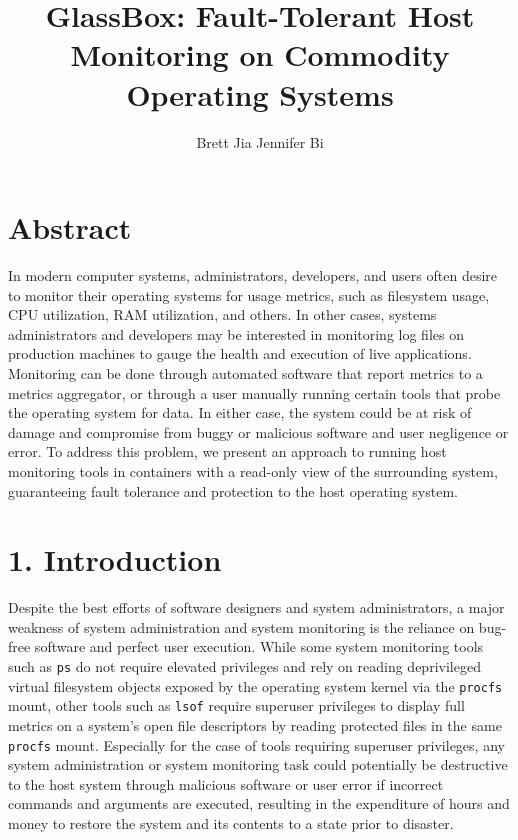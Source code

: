 \documentclass{proc}
\begin{document}
\title{GlassBox: Fault-Tolerant Host Monitoring on Commodity Operating Systems}

\author{Brett Jia \hspace{1em} Jennifer Bi}

\maketitle

\section*{Abstract}

In modern computer systems, administrators, developers, and users often desire to monitor their operating systems for usage metrics, such as filesystem usage, CPU utilization, RAM utilization, and others. In other cases, systems administrators and developers may be interested in monitoring log files on production machines to gauge the health and execution of live applications. Monitoring can be done through automated software that report metrics to a metrics aggregator, or through a user manually running certain tools that probe the operating system for data. In either case, the system could be at risk of damage and compromise from buggy or malicious software and user negligence or error. To address this problem, we present an approach to running host monitoring tools in containers with a read-only view of the surrounding system, guaranteeing fault tolerance and protection to the host operating system.

\section*{1. Introduction}

Despite the best efforts of software designers and system administrators, a major weakness of system administration and system monitoring is the reliance on bug-free software and perfect user execution. While some system monitoring tools such as \texttt{ps} do not require elevated privileges and rely on reading deprivileged virtual filesystem objects exposed by the operating system kernel via the \texttt{procfs} mount, other tools such as \texttt{lsof} require superuser privileges to display full metrics on a system's open file descriptors by reading protected files in the same \texttt{procfs} mount. Especially for the case of tools requiring superuser privileges, any system administration or system monitoring task could potentially be destructive to the host system through malicious software or user error if incorrect commands and arguments are executed, resulting in the expenditure of hours and money to restore the system and its contents to a state prior to disaster.
\end{document}
